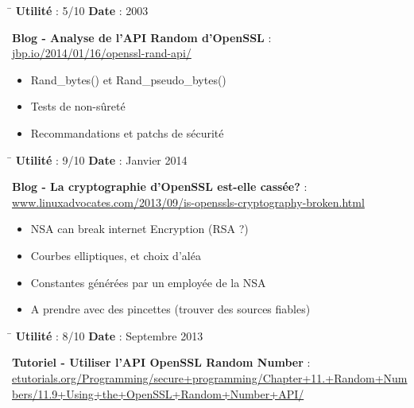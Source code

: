 \documentclass{article}
\begin{document}
	\begin{tabbing}
		\hspace{10cm}\=\kill
		\textbf{Utilité} : 5/10 \>	\textbf{Date} : 2003\\
	\end{tabbing}

	\textbf{Blog - Analyse de l'API Random d'OpenSSL} : \\
	\href{http://jbp.io/2014/01/16/openssl-rand-api/}
	{jbp.io/2014/01/16/openssl-rand-api/}\\

	\begin{itemize}
		\item Rand\_bytes() et Rand\_pseudo\_bytes()
		\item Tests de non-sûreté
		\item Recommandations et patchs de sécurité
	\end{itemize}
	
	\begin{tabbing}
		\hspace{10cm}\=\kill
		\textbf{Utilité} : 9/10 \>	\textbf{Date} : Janvier 2014\\
	\end{tabbing}
	
	\textbf{Blog - La cryptographie d'OpenSSL est-elle cassée?} : \\
	\href{http://www.linuxadvocates.com/2013/09/is-openssls-cryptography-broken.html}
	{www.linuxadvocates.com/2013/09/is-openssls-cryptography-broken.html}\\

	\begin{itemize}
		\item NSA can break internet Encryption (RSA ?)
		\item Courbes elliptiques, et choix d'aléa
		\item Constantes générées par un employée de la NSA
		\item A prendre avec des pincettes (trouver des sources fiables)
	\end{itemize}
		
	\begin{tabbing}
		\hspace{10cm}\=\kill
		\textbf{Utilité} : 8/10 \>	\textbf{Date} : Septembre 2013\\
	\end{tabbing}

		\textbf{Tutoriel - Utiliser l'API OpenSSL Random Number} : \\
		\href{http://etutorials.org/Programming/secure+programming/Chapter+11.+Random+Numbers/11.9+Using+the+OpenSSL+Random+Number+API/}
		{etutorials.org/Programming/secure+programming/Chapter+11.+Random+Numbers/11.9+Using+the+OpenSSL+Random+Number+API/}\\
\end{document}
